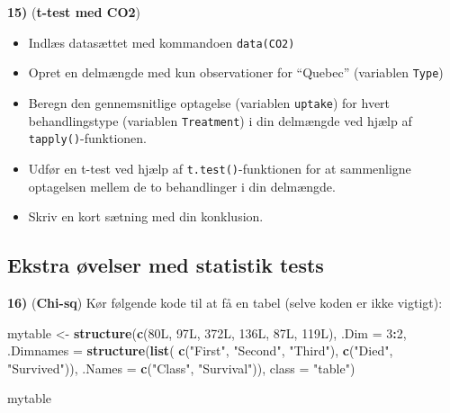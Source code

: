 \documentclass[
]{book}
\newenvironment{Shaded}{\begin{snugshade}}{\end{snugshade}}
\newcommand{\AttributeTok}[1]{\textcolor[rgb]{0.13,0.29,0.53}{#1}}
\newcommand{\DataTypeTok}[1]{\textcolor[rgb]{0.13,0.29,0.53}{#1}}
\newcommand{\DecValTok}[1]{\textcolor[rgb]{0.00,0.00,0.81}{#1}}
\newcommand{\FunctionTok}[1]{\textcolor[rgb]{0.13,0.29,0.53}{\textbf{#1}}}
\newcommand{\NormalTok}[1]{#1}
\newcommand{\OtherTok}[1]{\textcolor[rgb]{0.56,0.35,0.01}{#1}}
\newcommand{\SpecialCharTok}[1]{\textcolor[rgb]{0.81,0.36,0.00}{\textbf{#1}}}
\newcommand{\StringTok}[1]{\textcolor[rgb]{0.31,0.60,0.02}{#1}}
\providecommand{\tightlist}{%
  \setlength{\itemsep}{0pt}\setlength{\parskip}{0pt}}
\begin{document}
\textbf{15)} (\textbf{t-test med CO2})

\begin{itemize}
\tightlist
\item
  Indlæs datasættet med kommandoen \texttt{data(CO2)}
\item
  Opret en delmængde med kun observationer for ``Quebec'' (variablen \texttt{Type})
\item
  Beregn den gennemsnitlige optagelse (variablen \texttt{uptake}) for hvert behandlingstype (variablen \texttt{Treatment}) i din delmængde ved hjælp af \texttt{tapply()}-funktionen.
\item
  Udfør en t-test ved hjælp af \texttt{t.test()}-funktionen for at sammenligne optagelsen mellem de to behandlinger i din delmængde.
\item
  Skriv en kort sætning med din konklusion.
\end{itemize}

\subsection{Ekstra øvelser med statistik tests}\label{ekstra-uxf8velser-med-statistik-tests}

\textbf{16)} (\textbf{Chi-sq}) Kør følgende kode til at få en tabel (selve koden er ikke vigtigt):

\begin{Shaded}
\begin{Highlighting}[]
\NormalTok{mytable }\OtherTok{\textless{}{-}} \FunctionTok{structure}\NormalTok{(}\FunctionTok{c}\NormalTok{(}\DecValTok{80}\DataTypeTok{L}\NormalTok{, }\DecValTok{97}\DataTypeTok{L}\NormalTok{, }\DecValTok{372}\DataTypeTok{L}\NormalTok{, }\DecValTok{136}\DataTypeTok{L}\NormalTok{, }\DecValTok{87}\DataTypeTok{L}\NormalTok{, }\DecValTok{119}\DataTypeTok{L}\NormalTok{), }\AttributeTok{.Dim =} \DecValTok{3}\SpecialCharTok{:}\DecValTok{2}\NormalTok{, }\AttributeTok{.Dimnames =} \FunctionTok{structure}\NormalTok{(}\FunctionTok{list}\NormalTok{(}
    \FunctionTok{c}\NormalTok{(}\StringTok{"First"}\NormalTok{, }\StringTok{"Second"}\NormalTok{, }\StringTok{"Third"}\NormalTok{), }\FunctionTok{c}\NormalTok{(}\StringTok{"Died"}\NormalTok{, }\StringTok{"Survived"}\NormalTok{)), }\AttributeTok{.Names =} \FunctionTok{c}\NormalTok{(}\StringTok{"Class"}\NormalTok{, }\StringTok{"Survival"}\NormalTok{)), }\AttributeTok{class =} \StringTok{"table"}\NormalTok{)}

\NormalTok{mytable}
\end{Highlighting}
\end{Shaded}
\end{document}

